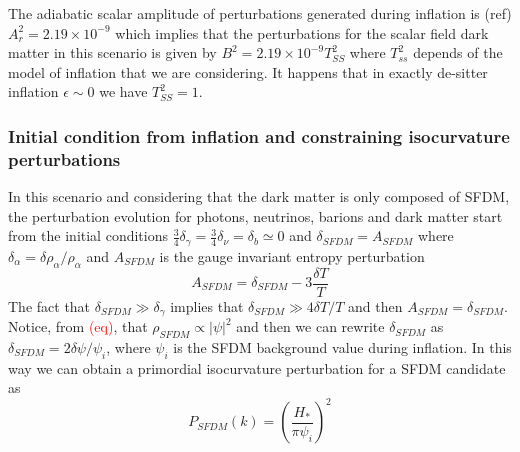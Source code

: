 \documentclass[twocolumn,           %
               showpacs,            %
               preprintnumbers,     %
               aps,                 %
               prl,          	    %
               letterpaper,             %
               superscriptaddress,      %
               nofootinbib,         %
               tightenlines,        %
               floats,floatfix      %
               ,usenatbib,
               ]{revtex4-1}
\begin{document}
The adiabatic scalar amplitude of perturbations generated during inflation is (ref) 
$A_r^2=2.19\times 10^{-9}
$ which implies that the perturbations for the scalar field dark matter in this scenario is given by $B^2=2.19\times 10^{-9}T_{SS}^2$ where $T_{ss}^2$ depends of the model of inflation that we are considering. It happens that in exactly de-sitter inflation $\epsilon\sim 0$ we have $T_{SS}^2=1$. 

\subsubsection{Initial condition from inflation and constraining isocurvature perturbations}

In this scenario and considering that the dark matter is only composed of SFDM, the perturbation evolution for photons, neutrinos, barions and dark matter start from the initial conditions $\frac{3}{4}\delta_{\gamma}=\frac{3}{4}\delta_\nu=\delta_b\simeq 0$ and $\delta_{SFDM}=A_{SFDM}$ where $\delta_{\alpha}=\delta \rho_\alpha/\rho_\alpha$ and $A_{SFDM}$ is the gauge invariant entropy perturbation
\begin{equation}
A_{SFDM}=\delta_{SFDM}-3\frac{\delta T}{T}
\end{equation}
The fact that $\delta_{SFDM}\gg \delta_{\gamma}$ implies that $\delta_{SFDM}\gg 4\delta T/T$ and then $A_{SFDM}=\delta_{SFDM}$. Notice, from \textcolor{red}{(eq)}, that $\rho_{SFDM}\propto |\psi|^2$ and then we can rewrite $\delta_{SFDM}$ as 
$\delta_{SFDM} = 2\delta \psi/\psi_i
$,
where $\psi_i$ is the SFDM background value during inflation. In this way we can obtain a primordial isocurvature perturbation for a SFDM candidate as
\begin{equation}
P_{SFDM}(k)=\left(\frac{H_*}{\pi \psi_i}\right)^2
\end{equation}
\end{document}
